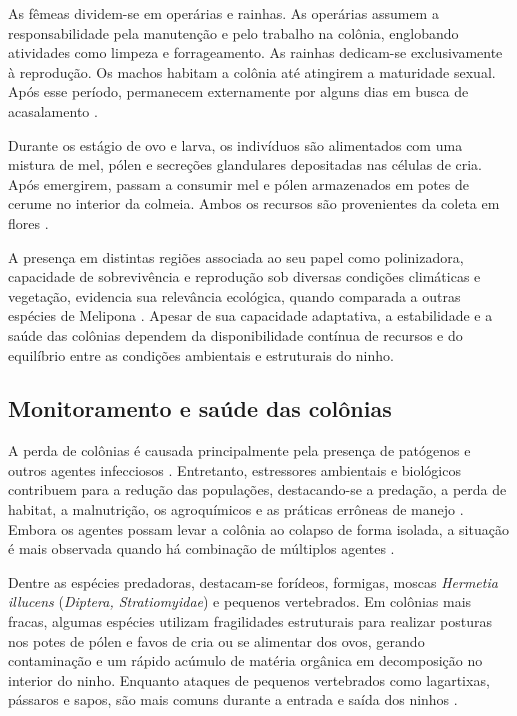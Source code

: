 \documentclass[12pt]{unisenaiclass}
\begin{document}
As fêmeas dividem-se em operárias e rainhas. As operárias assumem a responsabilidade pela manutenção e pelo trabalho na colônia, englobando atividades como limpeza e forrageamento. As rainhas dedicam-se exclusivamente à reprodução. Os machos habitam a colônia até atingirem a maturidade sexual. Após esse período, permanecem externamente por alguns dias em busca de acasalamento \cite{carvalhozilse2011meliponicultura}.

Durante os estágio de ovo e larva, os indivíduos são alimentados com uma mistura de mel, pólen e secreções glandulares depositadas nas células de cria. Após emergirem, passam a consumir mel e pólen armazenados em potes de cerume no interior da colmeia. Ambos os recursos são provenientes da coleta em flores \cite{melo2009colorpattern}.

A presença em distintas regiões associada ao seu papel como polinizadora, capacidade de sobrevivência e reprodução sob diversas condições climáticas e vegetação, evidencia sua relevância ecológica, quando comparada a outras espécies de Melipona \cite{melo2009colorpattern,pedro2014stingless}. Apesar de sua capacidade adaptativa, a estabilidade e a saúde das colônias dependem da disponibilidade contínua de recursos e do equilíbrio entre as condições ambientais e estruturais do ninho.

\subsection{Monitoramento e saúde das colônias}

A perda de colônias é causada principalmente pela presença de patógenos e outros agentes infecciosos \cite{evanshealth2011,schwarzpathosphere2015,caesargene2021}. Entretanto, estressores ambientais e biológicos contribuem para a redução das populações, destacando-se a predação, a perda de habitat, a malnutrição, os agroquímicos e as práticas errôneas de manejo \cite{goulsondeclines2015,davi1996biologia,caesargene2021}. Embora os agentes possam levar a colônia ao colapso de forma isolada, a situação é mais observada quando há combinação de múltiplos agentes \cite{brydenstress2013,caesargene2021}.

Dentre as espécies predadoras, destacam-se forídeos, formigas, moscas \textit{Hermetia illucens} (\textit{Diptera, Stratiomyidae}) e pequenos vertebrados. Em colônias mais fracas, algumas espécies utilizam fragilidades estruturais para realizar posturas nos potes de pólen e favos de cria ou se alimentar dos ovos, gerando contaminação e um rápido acúmulo de matéria orgânica em decomposição no interior do ninho. Enquanto ataques de pequenos vertebrados como lagartixas, pássaros e sapos, são mais comuns durante a entrada e saída dos ninhos \cite{pereiramanejo2012}.
\end{document}
